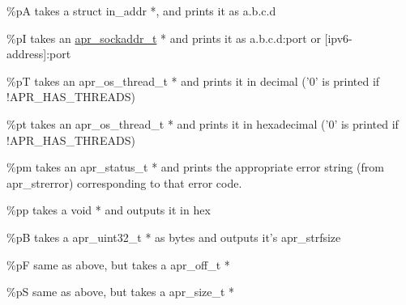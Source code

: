 \begin{DoxyItemize}
\item 
\begin{DoxyPre}\%pA takes a struct in\_addr *, and prints it as a.b.c.d\end{DoxyPre}

\item 
\begin{DoxyPre}\%pI takes an \hyperlink{structapr__sockaddr__t}{apr\_sockaddr\_t} * and prints it as a.b.c.d:port or
[ipv6-address]:port\end{DoxyPre}

\item 
\begin{DoxyPre}\%pT takes an apr\_os\_thread\_t * and prints it in decimal
('0' is printed if !APR\_HAS\_THREADS)\end{DoxyPre}

\item 
\begin{DoxyPre}\%pt takes an apr\_os\_thread\_t * and prints it in hexadecimal
('0' is printed if !APR\_HAS\_THREADS)\end{DoxyPre}

\item 
\begin{DoxyPre}\%pm takes an apr\_status\_t * and prints the appropriate error
string (from apr\_strerror) corresponding to that error code.\end{DoxyPre}

\item 
\begin{DoxyPre}\%pp takes a void * and outputs it in hex\end{DoxyPre}

\item 
\begin{DoxyPre}\%pB takes a apr\_uint32\_t * as bytes and outputs it's apr\_strfsize\end{DoxyPre}

\item 
\begin{DoxyPre}\%pF same as above, but takes a apr\_off\_t *\end{DoxyPre}

\item 
\begin{DoxyPre}\%pS same as above, but takes a apr\_size\_t *\end{DoxyPre}

\end{DoxyItemize}



